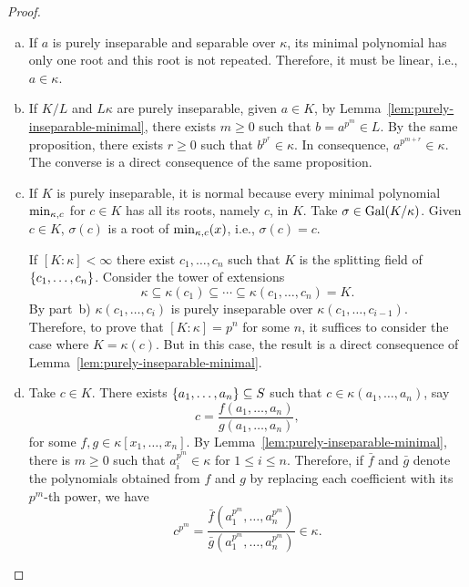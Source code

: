 \begin{proof}${}$
    \begin{enumerate}[a), font=\upshape]
        \item If $a$ is purely inseparable and separable over $\kappa$, its minimal polynomial has only one root and this root is not repeated. Therefore, it must be linear, i.e., $a\in\kappa$.

        \item If $K/L$ and $L\kappa$ are purely inseparable, given $a\in K$, by Lemma~\ref{lem:purely-inseparable-minimal}, there exists $m\ge0$ such that $b=a^{p^m}\in L$. By the same proposition, there exists $r\ge0$ such that $b^{p^r}\in\kappa$. In consequence, $a^{p^{m+r}}\in\kappa$. The converse is a direct consequence of the same proposition.

        \item If $K$ is purely inseparable, it is normal because every minimal polynomial $\operatorname{min}_{\kappa,c}$ for $c\in K$ has all its roots, namely $c$, in $K$. Take $\sigma\in \operatorname{Gal}(K/\kappa)$. Given $c\in K$, $\sigma(c)$ is a root of $\operatorname{min}_{\kappa,c}(x)$, i.e., $\sigma(c)=c$.

        If $[K:\kappa]<\infty$ there exist $c_1,\dots,c_n$ such that $K$ is the splitting field of $\{c_1,\dots,c_n\}$. Consider the tower of extensions
        $$
            \kappa\subseteq\kappa(c_1)\subseteq\cdots\subseteq
                \kappa(c_1,\dots,c_n)=K.
        $$
        By part~b) $\kappa(c_1,\dots,c_i)$ is purely inseparable over $\kappa(c_1,\dots,c_{i-1})$. Therefore, to prove that $[K:\kappa]=p^n$ for some $n$, it suffices to consider the case where $K=\kappa(c)$. But in this case, the result is a direct consequence of Lemma~\ref{lem:purely-inseparable-minimal}.


        \item Take $c\in K$. There exists $\{a_1,\dots,a_n\}\subseteq S$ such that $c\in\kappa(a_1,\dots,a_n)$, say
        $$
            c = \frac{f(a_1,\dots,a_n)}{g(a_1,\dots,a_n)},
        $$
        for some $f,g\in\kappa[x_1,\dots,x_n]$. By Lemma~\ref{lem:purely-inseparable-minimal}, there is $m\ge0$ such that $a_i^{p^m}\in \kappa$ for $1\le i\le n$. Therefore, if $\bar{f}$ and $\bar{g}$ denote the polynomials obtained from $f$ and $g$ by replacing each coefficient with its $p^m$-th power, we have
        $$
            c^{p^m}=\frac{\bar f(a_1^{p^m},\dots,a_n^{p^m})}
                {\bar g(a_1^{p^m},\dots,a_n^{p^m})}\in\kappa.
        $$
    \end{enumerate}
\end{proof}

